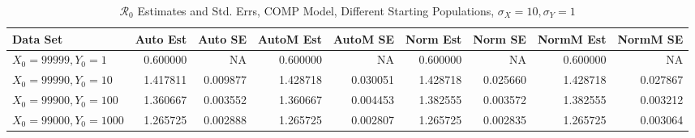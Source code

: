 \documentclass[12pt]{article}
\newcommand{\rr}{\ensuremath{\mathcal{R}_0}}
\begin{document}
\begin{table}[H]
	
	\caption{$\rr$ Estimates and Std. Errs, COMP Model,
		Different Starting Populations, 
		$\sigma_X = 10, \sigma_Y = 1$}
	\begin{footnotesize}
		\hskip -1.7cm
		\begin{tabular}{l|r|r|r|r|r|r|r|r}
			\hline
			Data Set & Auto Est & Auto SE & AutoM Est & AutoM SE & Norm Est & Norm SE & NormM Est & NormM SE\\
			\hline
			$X_0 = 99999, Y_0 = 1$ & 0.600000 & NA & 0.600000 & NA & 0.600000 & NA & 0.600000 & NA\\
			\hline
			$X_0 = 99990, Y_0 = 10$ & 1.417811 & 0.009877 & 1.428718 & 0.030051 & 1.428718 & 0.025660 & 1.428718 & 0.027867\\
			\hline
			$X_0 = 99900, Y_0 = 100$ & 1.360667 & 0.003552 & 1.360667 & 0.004453 & 1.382555 & 0.003572 & 1.382555 & 0.003212\\
			\hline
			$X_0 = 99000, Y_0 = 1000$ & 1.265725 & 0.002888 & 1.265725 & 0.002807 & 1.265725 & 0.002835 & 1.265725 & 0.003064\\
			\hline
		\end{tabular}
	\end{footnotesize}
\end{table}
\end{document}
